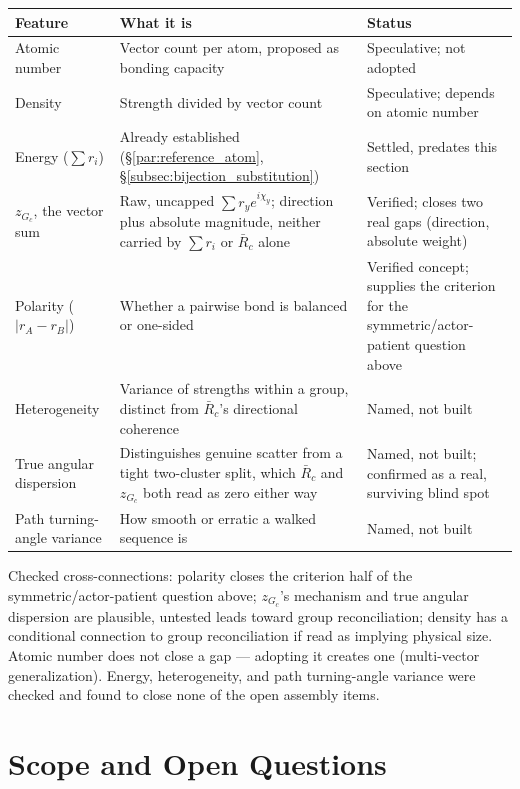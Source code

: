 \documentclass[12pt, a4paper]{article}
\begin{document}
\begin{center}
\begin{tabular}{lp{6.5cm}l}
\hline
Feature & What it is & Status \\
\hline
Atomic number &
  Vector count per atom, proposed as bonding capacity &
  Speculative; not adopted \\
Density &
  Strength divided by vector count &
  Speculative; depends on atomic number \\
Energy ($\sum r_i$) &
  Already established
  (\S\ref{par:reference_atom}, \S\ref{subsec:bijection_substitution}) &
  Settled, predates this section \\
$z_{G_c}$, the vector sum &
  Raw, uncapped $\sum r_y e^{i\chi_y}$; direction plus absolute
  magnitude, neither carried by $\sum r_i$ or $\bar R_c$ alone &
  Verified; closes two real gaps (direction, absolute weight) \\
Polarity ($\lvert r_A-r_B\rvert$) &
  Whether a pairwise bond is balanced or one-sided &
  Verified concept; supplies the criterion for the
  symmetric/actor-patient question above \\
Heterogeneity &
  Variance of strengths within a group, distinct from $\bar R_c$'s
  directional coherence &
  Named, not built \\
True angular dispersion &
  Distinguishes genuine scatter from a tight two-cluster split,
  which $\bar R_c$ and $z_{G_c}$ both read as zero either way &
  Named, not built; confirmed as a real, surviving blind spot \\
Path turning-angle variance &
  How smooth or erratic a walked sequence is &
  Named, not built \\
\hline
\end{tabular}
\end{center}

Checked cross-connections: polarity closes the criterion half of the
symmetric/actor-patient question above; $z_{G_c}$'s mechanism and
true angular dispersion are plausible, untested leads toward group
reconciliation; density has a conditional connection to group
reconciliation if read as implying physical size. Atomic number does
not close a gap --- adopting it creates one (multi-vector
generalization). Energy, heterogeneity, and path turning-angle
variance were checked and found to close none of the open assembly
items.

\section{Scope and Open Questions}
\label{sec:scope}
\end{document}
